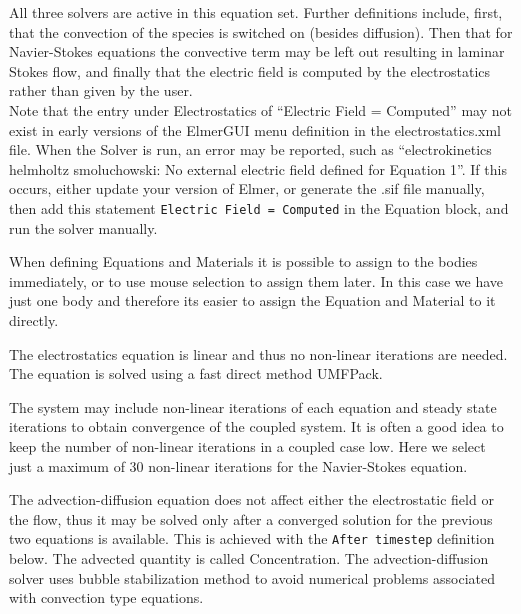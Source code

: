 All three solvers are active in this equation set. Further definitions include, first, that the convection of the species is switched on (besides diffusion). Then that for Navier-Stokes equations the convective term may be left out resulting in laminar Stokes flow, and finally that the electric field is computed by the electrostatics rather than given by the user. \\

Note that the entry under Electrostatics of ``Electric Field = Computed'' may not exist in early versions of the ElmerGUI menu definition in the electrostatics.xml file.  When the Solver is run, an error may be reported, such as ``electrokinetics helmholtz  smoluchowski: No external electric field defined for Equation 1''.  If this occurs, either update your version of Elmer, or generate the .sif file manually, then add this statement \texttt{Electric Field = Computed} in the Equation block, and run the solver manually.

When defining Equations and Materials it is possible to assign to the bodies immediately, or to use mouse selection to assign them later. In this case we have just one body and therefore its easier to assign the Equation and Material to it directly.  

The electrostatics equation is linear and thus no non-linear iterations are needed. The equation is solved using a fast direct method UMFPack.

The system may include non-linear iterations of each equation and steady state iterations to obtain convergence of the coupled system. It is often a good idea to keep the number of non-linear iterations in a coupled case low.  Here we select just  a maximum of 30 non-linear iterations for the Navier-Stokes equation.

The advection-diffusion equation does not affect either the electrostatic field or the flow, thus it may be solved only after a converged solution for the previous two equations is available. This is achieved with the \texttt{After timestep} definition below. The advected quantity is called Concentration.  The advection-diffusion solver uses bubble stabilization method to avoid numerical problems associated with convection type equations.\\


